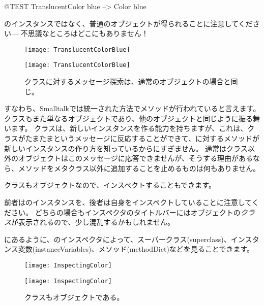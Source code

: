 \documentclass[a4paper,10pt,twoside]{book}
\begin{document}
\begin{code}{@TEST}
TranslucentColor blue --> Color blue
\end{code}
\noindent
{}のインスタンスではなく、普通のオブジェクトが得られることに注意してください\,---\,不思議なところはどこにもありません！

\begin{center}
\begin{figure}[!ht]
\ifluluelse
	{\centerline {\texttt{[image: TranslucentColorBlue]}}}
	{\centerline {\texttt{[image: TranslucentColorBlue]}}}
\caption{クラスに対するメッセージ探索は、通常のオブジェクトの場合と同じ。}
\end{figure}
\end{center}

すなわち、Smalltalkでは統一された方法でメソッドが行われていると言えます。クラスもまた単なるオブジェクトであり、他のオブジェクトと同じように振る舞います。
クラスは、新しいインスタンスを作る能力を持ちますが、これは、クラスがたまたまというメッセージに反応することができて、に対するメソッドが新しいインスタンスの作り方を知っているからにすぎません。
通常はクラス以外のオブジェクトはこのメッセージに応答できませんが、そうする理由があるなら、メソッドをメタクラス以外に追加することを止めるものは何もありません。

クラスもオブジェクトなので、インスペクトすることもできます。


\noindent
前者はのインスタンスを、後者は自身をインスペクトしていることに注意してください。
どちらの場合もインスペクタのタイトルバーにはオブジェクトの\emph{クラス}が表示されるので、少し混乱するかもしれません。

にあるように、のインスペクタによって、スーパークラス(superclass)、インスタンス変数(instanceVariables)、メソッド(methodDict)などを見ることできます。

\begin{center}
\begin{figure}[!ht]
\ifluluelse
	{\centerline{\texttt{[image: InspectingColor]}}}
	{\centerline{\texttt{[image: InspectingColor]}}}
\caption{クラスもオブジェクトである。}
\end{figure}
\end{center}
\end{document}
